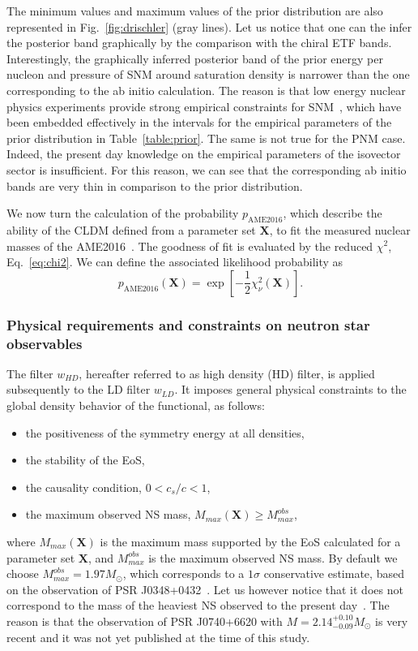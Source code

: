 The minimum values and maximum values of the prior distribution are also
represented in Fig.~\ref{fig:drischler} (gray lines). Let us notice that one 
can the infer the posterior band graphically by the comparison with the chiral 
ETF bands. Interestingly, the graphically inferred posterior band of the 
prior energy per nucleon and pressure of SNM around saturation density is 
narrower than the one corresponding to the ab initio calculation. The reason is
that low energy nuclear physics experiments provide strong empirical
constraints for SNM~\cite{Margueron2018a}, which have been embedded 
effectively in the intervals for the empirical parameters of the prior
distribution in Table~\ref{table:prior}. The same is not true for the PNM case. 
Indeed, the present day knowledge on the empirical parameters of the 
isovector sector is insufficient. For this reason, we can see that the 
corresponding ab initio bands are very thin in comparison to the prior 
distribution.

We now turn the calculation of the probability $p_{\text{AME2016}}$, which 
describe the ability of the CLDM defined from a parameter set $\bm{X}$, to fit 
the measured nuclear masses of the AME2016~\cite{Huang2017}. The goodness of 
fit is evaluated by the reduced $\chi^2$, Eq.~\ref{eq:chi2}. We can define the 
associated likelihood probability as
%
\begin{equation}
  p_{\text{AME2016}}(\bm{X}) = \exp\left[-\frac{1}{2}\chi_\nu^2(\bm{X})\right].
\end{equation}
%
 
\subsubsection{Physical requirements and constraints on neutron star 
observables}\label{subsubsec:hdconst}

The filter $w_{HD}$, hereafter referred to as high density (HD) filter, is
applied subsequently to the LD filter $w_{LD}$. It imposes general physical 
constraints to the global density behavior of the functional, as follows:
%
\begin{itemize}
  \item the positiveness of the symmetry energy at all densities,
  \item the stability of the EoS,
  \item the causality condition, $0 < c_s/c < 1$,
  \item the maximum observed NS mass, $M_{max}(\bm{X}) \geq M_{max}^{obs}$,
\end{itemize}
%
where $M_{max}(\bm{X})$ is the maximum mass supported by the EoS calculated for 
a parameter set $\bm{X}$, and $M_{max}^{obs}$ is the maximum observed NS mass. 
By default we choose $M_{max}^{obs} = 1.97M_\odot$, which corresponds to 
a $1\sigma$ conservative estimate, based on the observation of PSR 
J0348+0432~\cite{Antoniadis2013}. 
Let us however notice that it does not correspond to the mass of the heaviest 
NS observed to the present day~\cite{Cromartie2020}. The reason is that the
observation of PSR J0740+6620 with $M = 2.14_{-0.09}^{+0.10}M_\odot$ is very 
recent and it was not yet published at the time of this study.


